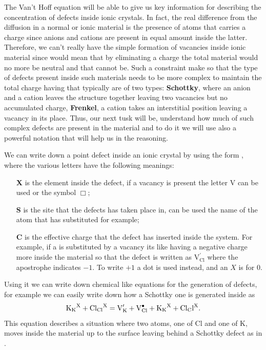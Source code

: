 The Van't Hoff equation will be able to give us key information for describing the concentration of defects inside ionic crystals. In fact, the real difference from the diffusion in a normal or ionic material is the presence of atoms that carries a charge since anions and cations are present in equal amount inside the latter. Therefore, we can't really have the simple formation of vacancies inside ionic material since would mean that by eliminating a charge the total material would no more be neutral and that cannot be. Such a constraint make so that the type of defects present inside such materials needs to be more complex to maintain the total charge having that typically are of two types: \textbf{Schottky}, where an anion and a cation leaves the structure together leaving two vacancies but no accumulated charge, \textbf{Frenkel}, a cation takes an interstitial position leaving a vacancy in its place. Thus, our next tusk will be, understand how much of such complex defects are present in the material and to do it we will use also a powerful notation that will help us in the reasoning.
{
    We can write down a point defect inside an ionic crystal by using the form , where the various letters have the following meanings:
    \begin{itemize}[align=left, leftmargin=*]
        \item[\textbf{X}] is the element inside the defect, if a vacancy is present the letter V can be used or the symbol $\Box$;
        \item[\textbf{S}] is the site that the defects has taken place in, can be used the name of the atom that has substituted for example;
        \item[\textbf{C}] is the effective charge that the defect has inserted inside the system. For example, if a  is substituted by a vacancy its like having a negative charge more inside the material so that the defect is written as $\text{V}^\prime_{\text{Cl}}$ where the apostrophe indicates $-1$. To write $+1$ a dot is used instead, and an $X$ is for $0$.
    \end{itemize}
}
\noindent
Using it we can write down chemical like equations for the generation of defects, for example we can easily write down how a Schottky one is generated inside  as
\begin{equation}
    \ce{K_K^X} + \ce{Cl_{Cl}^X} = \ce{V_K}^\prime + \ce{V_{Cl}}^\bullet + \ce{K_K^X} + \ce{Cl_Cl^X}.
\end{equation}
This equation describes a situation where two atoms, one of Cl and one of K, moves inside the material up to the surface leaving behind a Schottky defect as in .
